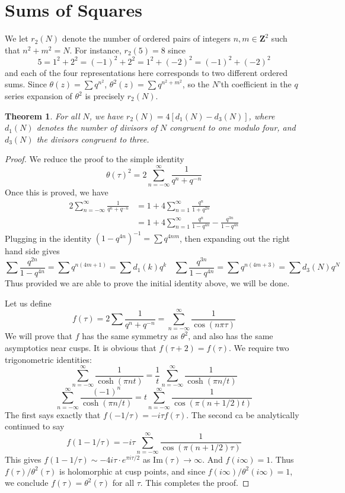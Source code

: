 \documentclass{article}
\theoremstyle{plain}
\newtheorem{theorem}{Theorem}
\theoremstyle{remark}
\theoremstyle{definition}
\begin{document}
\section{Sums of Squares}

We let $r_2(N)$ denote the number of ordered pairs of integers $n,m \in \mathbf{Z}^2$ such that $n^2 + m^2 = N$. For instance, $r_2(5) = 8$ since
%
\[ 5 = 1^2 + 2^2 = (-1)^2 + 2^2 = 1^2 + (-2)^2 = (-1)^2 + (-2)^2 \]
%
and each of the four representations here corresponds to two different ordered sums. Since $\theta(z) = \sum q^{n^2}$, $\theta^2(z) = \sum q^{n^2 + m^2}$, so the $N$'th coefficient in the $q$ series expansion of $\theta^2$ is precisely $r_2(N)$.

\begin{theorem}
    For all $N$, we have $r_2(N) = 4[d_1(N) - d_3(N)]$, where $d_1(N)$ denotes the number of divisors of $N$ congruent to one modulo four, and $d_3(N)$ the divisors congruent to three.
\end{theorem}
\begin{proof}
    We reduce the proof to the simple identity
    \[ \theta(\tau)^2 = 2 \sum_{n = -\infty}^\infty \frac{1}{q^n + q^{-n}} \]
    Once this is proved, we have
    \begin{align*}
        2 \sum_{n = -\infty}^\infty \frac{1}{q^n + q^{-n}} &= 1 + 4 \sum_{n = 1}^\infty \frac{q^{n}}{1 + q^{2n}}\\
        &= 1 + 4 \sum_{n = 1}^\infty \frac{q^n}{1 - q^{4n}} - \frac{q^{3n}}{1 - q^{4n}}
    \end{align*}
    Plugging in the identity $(1 - q^{4n})^{-1} = \sum q^{4nm}$, then expanding out the right hand side gives
    \[ \sum \frac{q^{2n}}{1 - q^{4n}} = \sum q^{n(4m + 1)} = \sum d_1(k) q^k\ \ \ \ \sum \frac{q^{3n}}{1 - q^{4n}} = \sum q^{n(4m + 3)} = \sum d_3(N) q^N \]
    Thus provided we are able to prove the initial identity above, we will be done.

    Let us define
    \[ f(\tau) = 2 \sum \frac{1}{q^n + q^{-n}} = \sum_{n = -\infty}^\infty \frac{1}{\cos(n \pi \tau)} \]
    We will prove that $f$ has the same symmetry as $\theta^2$, and also has the same asymptotics near cusps. It is obvious that $f(\tau + 2) = f(\tau)$. We require two trigonometric identities:
    \[ \sum_{n = -\infty}^\infty \frac{1}{\cosh(\pi n t)} = \frac{1}{t} \sum_{n = -\infty}^\infty \frac{1}{\cosh(\pi n/t)} \]
    \[ \sum_{n = -\infty}^\infty \frac{(-1)^n}{\cosh(\pi n/t)} = t \sum_{n = -\infty}^\infty \frac{1}{\cos(\pi(n + 1/2)t)} \]
    The first says exactly that $f(-1/\tau) = -i\tau f(\tau)$. The second ca be analytically continued to say
    \[ f(1 - 1/\tau) = -i \tau \sum_{n = -\infty}^\infty \frac{1}{\cos(\pi(n + 1/2)\tau)} \]
    This gives $f(1 - 1/\tau) \sim -4i \tau \cdot e^{\pi i \tau/2}$ as $\text{Im}(\tau) \to \infty$. And $f(i \infty) = 1$. Thus $f(\tau)/\theta^2(\tau)$ is holomorphic at cusp points, and since $f(i\infty)/\theta^2(i \infty) = 1$, we conclude $f(\tau) = \theta^2(\tau)$ for all $\tau$. This completes the proof.
\end{proof}
\end{document}
